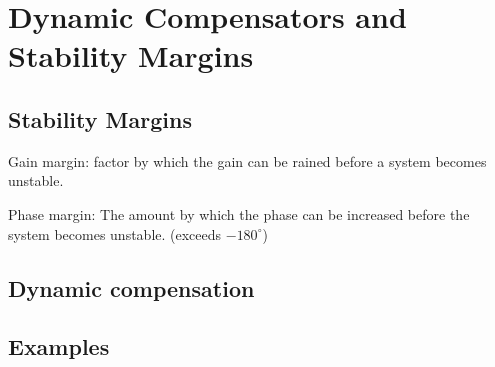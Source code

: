 \section{Dynamic Compensators and Stability Margins}

\subsection{Stability Margins}

Gain margin: factor by which the gain can be rained before a system becomes unstable.

Phase margin: The amount by which the phase can be increased before the system becomes unstable. (exceeds $-180 ^\circ$)




\subsection{Dynamic compensation}


\subsection{Examples}
